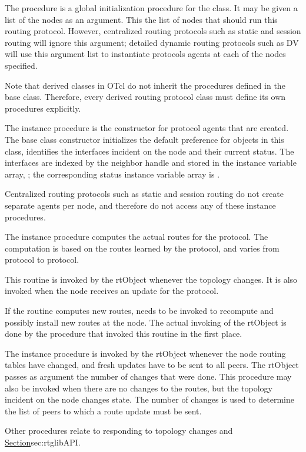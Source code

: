 \begin{list}{---}{}
\item
The procedure
is a global initialization procedure for the class.
It may be given a list of the nodes as an argument.
This the list of nodes that should run this routing protocol.
However, centralized routing protocols such as static and session routing
will ignore this argument;
detailed dynamic routing protocols such as DV will use this argument
list to instantiate protocols agents at each of the nodes specified.

Note that derived classes in OTcl do not inherit the procedures
defined in the base class. 
Therefore, every derived routing protocol class must define its own
procedures explicitly.

\item
The instance procedure
is the constructor for protocol agents that are created.
The base class constructor initializes the default preference 
for objects in this class,
identifies the interfaces incident on the node and their current status.
The interfaces are indexed by the neighbor handle and stored in the instance
variable array, ;
the corresponding status instance variable array is .

Centralized routing protocols such as static and session routing do not
create separate agents per node, and therefore do not access any of these
instance procedures.

\item
The instance procedure
computes the actual routes for the protocol.
The computation is based on the routes learned by the protocol, and
varies from protocol to protocol.

This routine is invoked by the rtObject whenever the topology changes.
It is also invoked when the node receives an update for the protocol.

If the routine computes new routes, 
 needs to be invoked
to recompute and possibly install new routes at the node.
The actual invoking of the rtObject is done by the procedure
that invoked this routine in the first place.

\item
The instance procedure
is invoked by the rtObject whenever the node routing tables have changed,
and fresh updates have to be sent to all peers.
The rtObject passes as argument the number of changes that were done.
This procedure may also be invoked when there are no changes to the routes,
but the topology incident on the node changes state.
The number of changes is used to determine the list of peers to which
a route update must be sent.
\end{list}
Other procedures relate to responding to topology changes and
\href{are described later}{Section}{sec:rtglibAPI}.

